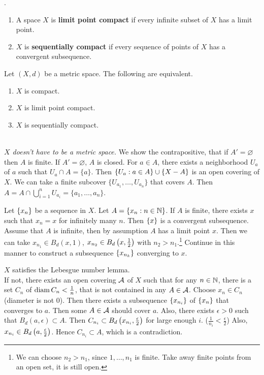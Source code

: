 .
\begin{enumerate}
    \item {} A space \(X\) is \textbf{limit point compact} if every infinite subset of \(X\) has a limit point.

    \item {} \(X\) is \textbf{sequentially compact} if every sequence of points of \(X\) has a convergent subsequence.
\end{enumerate}

 Let \((X, d)\) be a metric space. The following are equivalent.
\begin{enumerate}
    \item \(X\) is compact.
    \item \(X\) is limit point compact.
    \item \(X\) is sequentially compact.
\end{enumerate}

\pf \\
  \textit{\(X\) doesn't have to be a metric space.} We show the contrapositive, that if \(A' = \varnothing\) then \(A\) is finite. If \(A' = \varnothing\), \(A\) is closed. For \(a \in A\), there exists a neighborhood \(U_a\) of \(a\) such that \(U_a \cap A = \{a\}\). Then \(\{U_a : a \in A\} \cup \{X - A\}\) is an open covering of \(X\). We can take a finite subcover \(\{U_{a_1}, \dots, U_{a_n}\}\) that covers \(A\). Then \(A = A \cap \bigcup_{i=1}^n U_{a_i} = \{a_1, \dots, a_n\}\).

 Let \(\left\{ x_n \right\}\) be a sequence in \(X\). Let \(A = \{x_n : n \in \mathbb{N}\}\). If \(A\) is finite, there exists \(x\) such that \(x_n = x\) for infinitely many \(n\). Then \(\left\{ x \right\}\) is a convergent subsequence. Assume that \(A\) is infinite, then by assumption \(A\) has a limit point \(x\). Then we can take \(x_{n_1} \in B_d(x, 1)\), \(x_{n_2} \in B_d\left( x, \frac{1}{2} \right)\) with \(n_2 > n_1\).\footnote{We can choose \(n_2 > n_1\), since \(1, \dots, n_1\) is finite. Take away finite points from an open set, it is still open.} Continue in this manner to construct a subsequence \(\left\{ x_{n_k} \right\}\) converging to \(x\).

  \(X\) satisfies the Lebesgue number lemma. \\
If not, there exists an open covering \(\mathcal{A}\) of \(X\) such that for any \(n \in \mathbb{N}\), there is a set \(C_n\) of \(\operatorname{diam} C_n < \frac{1}{n}\), that is not contained in any \(A \in \mathcal{A}\). Choose \(x_n \in C_n\) (diameter is not 0). Then there exists a subsequence \(\left\{ x_{n_i} \right\}\) of \(\left\{ x_n \right\}\) that converges to \(a\). Then some \(A \in \mathcal{A}\) should cover \(a\). Also, there exists \(\epsilon > 0\) such that \(B_d(a, \epsilon) \subset A\). Then \(C_{n_i} \subset B_d\left( x_{n_i}, \frac{\epsilon}{2} \right)\) for large enough \(i\). (\(\frac{1}{n_i} < \frac{\epsilon}{2}\)) Also, \(x_{n_i} \in B_d\left( a, \frac{\epsilon}{2} \right)\). Hence \(C_{n_i} \subset A\), which is a contradiction.

